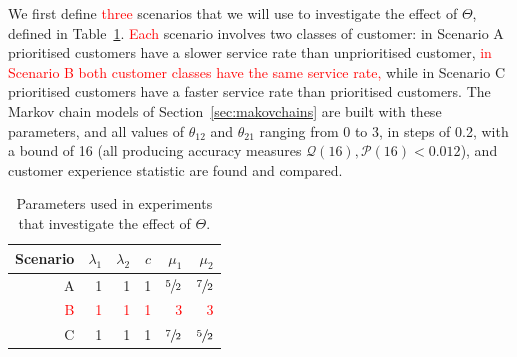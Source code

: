 \documentclass{article}
\begin{document}
We first define \textcolor{red}{three} scenarios that we will use to investigate
the effect of $\Theta$, defined in Table~\ref{tbl:scenarios}.
\textcolor{red}{Each} scenario involves two classes of customer: in Scenario A
prioritised customers have a slower service rate than unprioritised customer,
\textcolor{red}{in Scenario B both customer classes have the same service rate,}
while in Scenario C prioritised customers have a faster service rate than
prioritised customers.
The Markov chain models of Section~\ref{sec:makovchains} are built with these
parameters, and all values of $\theta_{12}$ and $\theta_{21}$ ranging from 0 to
3, in steps of 0.2, with a bound of 16 (all producing accuracy measures
$\mathcal{Q}(16), \mathcal{P}(16) < 0.012$), and customer experience statistic
are found and compared.

\begin{table}
\begin{center}
\begin{tabular}{rrrrrr}
\toprule
Scenario & $\lambda_1$ & $\lambda_2$ & $c$ & $\mu_1$ & $\mu_2$ \\
\midrule
A & 1 & 1 & 1& $\sfrac{5}{2}$ & $\sfrac{7}{2}$\\ 
\textcolor{red}{B} & \textcolor{red}{1} & \textcolor{red}{1} & \textcolor{red}{1} & \textcolor{red}{$3$} & \textcolor{red}{$3$}\\
C & 1 & 1 & 1& $\sfrac{7}{2}$ & $\sfrac{5}{2}$\\
\bottomrule
\end{tabular}
\end{center}
\caption{Parameters used in experiments that investigate the effect of $\Theta$.}
\label{tbl:scenarios}
\end{table}
\end{document}
